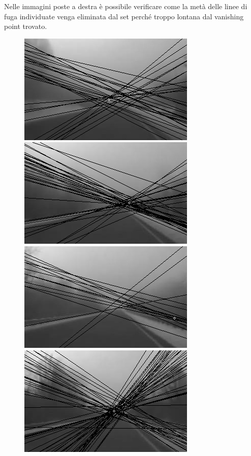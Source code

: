 \documentclass[12pt]{report}
\begin{document}
\noindent Nelle immagini poste a destra \`e possibile verificare come la met\`a delle linee di fuga individuate venga eliminata dal set perch\'e troppo lontana dal vanishing point trovato.\\

\newcommand{\imTrackScale}{0.7}
\begin{figure}[H]
\begin{minipage}[c]{0.5\linewidth}
	\centering
	\includegraphics[scale=\imTrackScale]{images/bF_0000_15.png}
	\includegraphics[scale=\imTrackScale]{images/bF_0020_15.png}
	\includegraphics[scale=\imTrackScale]{images/bF_0040_15.png}
	\includegraphics[scale=\imTrackScale]{images/bF_0060_15.png}

\end{minipage}
\end{figure}
\end{document}
